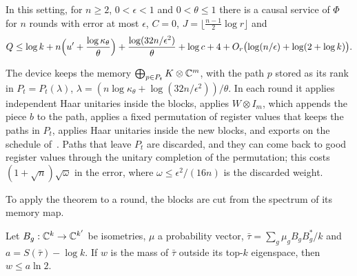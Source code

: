 \begin{theorem}\label{thm:pathreg}
In this setting, for $n\ge2$, $0<\epsilon<1$ and $0<\theta\le1$ there is a causal service of $\Phi$ for $n$ rounds with error at most $\epsilon$,
$C=0$, $J=\lfloor\frac{n-1}2\log r\rfloor$ and
\[
Q\le\log k+n\Bigl(u'+\frac{\log\kappa_\theta}\theta\Bigr)+\frac{\log(32n/\epsilon^2)}\theta+\log c+4+O_r\bigl(\log(n/\epsilon)+\log(2+\log k)\bigr).
\]
\end{theorem}

The device keeps the memory $\bigoplus_{p\in P_t}K\otimes\mathbb C^m$, with the path $p$ stored as its rank in $P_t=P_t(\lambda)$,
$\lambda=(n\log\kappa_\theta+\log(32n/\epsilon^2))/\theta$. In each round it applies independent Haar unitaries inside the blocks, applies
$W\otimes I_m$, which appends the piece $b$ to the path, applies a fixed permutation of register values that keeps the paths in $P_t$, applies
Haar unitaries inside the new blocks, and exports on the schedule of~\cite[Theorem~12.2]{DouglasMghirbiC}. Paths that leave $P_t$ are discarded,
and they can come back to good register values through the unitary completion of the permutation; this costs $(1+\sqrt n)\sqrt\omega$ in the
error, where $\omega\le\epsilon^2/(16n)$ is the discarded weight.

To apply the theorem to a round, the blocks are cut from the spectrum of its memory map.

\begin{lemma}\label{lem:top}
Let $B_g:\mathbb C^k\to\mathbb C^{k'}$ be isometries, $\mu$ a probability vector, $\bar\tau=\sum_g\mu_gB_gB_g^*/k$ and $a=S(\bar\tau)-\log k$. If $w$ is the
mass of $\bar\tau$ outside its top-$k$ eigenspace, then $w\le a\ln2$.
\end{lemma}

